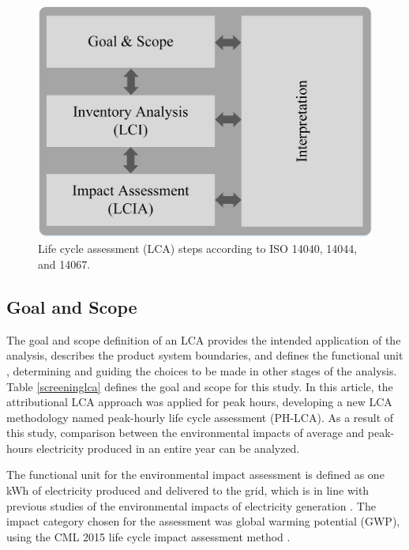 {\begin{figure}[htbp]
	\centering
	\includegraphics[width=0.6\columnwidth ]{ChapterLCA/Images/LCA_Framework_v3.jpg}
		\caption{Life cycle assessment (LCA) steps according to ISO 14040, 14044, and 14067.}
	\label{LCA_Methodology}  %
\end{figure}


{\subsection {Goal and Scope} \label{goalscope}}
{The goal and scope definition of an LCA provides the intended application of the analysis, describes the product system boundaries, and defines the functional unit \cite{REBITZER2004701}, determining and guiding the choices to be made in other stages of the analysis. Table \ref{screeninglca} defines the goal and scope for this study.} {In this article, the attributional LCA approach was applied for peak hours, developing a new LCA methodology named peak-hourly life cycle assessment (PH-LCA). As a result of this study, comparison between the environmental impacts of average and peak-hours  electricity produced in an entire year can be analyzed.} 

{The functional unit for the environmental impact assessment is defined as one kWh of electricity produced and delivered to the grid, which is in line with previous studies of the environmental impacts of electricity generation \cite{Nilsson2017AssessingEmissions, Khan2018, Khan2018AnalysisIntensity, MESSAGIE2014469, Cubi2015IncorporationAssessment, Buyle2019}. The impact category chosen for the assessment was global warming potential (GWP), using the CML 2015 life cycle impact assessment method \cite{Guinee2001}.} 

}
